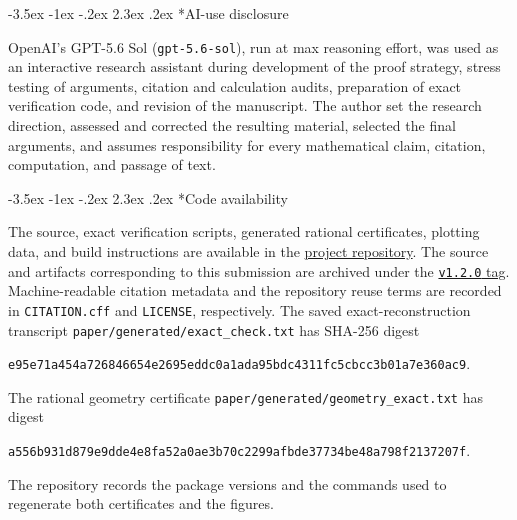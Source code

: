 \documentclass[twoside,10pt]{article}
\makeatletter
\numberwithin{equation}{section}
\theoremstyle{slbody}
\theoremstyle{definition}
\theoremstyle{remark}
\renewcommand{\section}{%
  \@startsection{section}{1}{\z@}%
    {-3.5ex \@plus -1ex \@minus -.2ex}%
    {2.3ex \@plus .2ex}%
    {\normalfont\large\bfseries}}
\makeatother
\begin{document}
\section*{AI-use disclosure}

OpenAI's GPT-5.6 Sol (\texttt{gpt-5.6-sol}), run at max reasoning
effort, was used as an interactive research assistant during development
of the proof strategy, stress testing of arguments, citation and
calculation audits, preparation of exact verification code, and revision
of the manuscript.  The author set the research direction, assessed and
corrected the resulting material, selected the final arguments, and
assumes responsibility for every mathematical claim, citation,
computation, and passage of text.

\section*{Code availability}

The source, exact verification scripts, generated rational certificates,
plotting data, and build instructions are available in the
\href{https://github.com/skypher/su2-markovian-embeddability}{project
repository}.  The source and artifacts corresponding to this submission
are archived under the
\href{https://github.com/skypher/su2-markovian-embeddability/tree/v1.2.0}
{\texttt{v1.2.0} tag}.  Machine-readable citation
metadata and the
repository reuse terms are recorded in \texttt{CITATION.cff} and
\texttt{LICENSE}, respectively.
The saved
exact-reconstruction transcript
\texttt{paper/generated/exact\_check.txt} has SHA-256 digest
\begin{center}
\small\texttt{e95e71a454a726846654e2695eddc0a1ada95bdc4311fc5cbcc3b01a7e360ac9}.
\end{center}
The rational geometry certificate
\texttt{paper/generated/geometry\_exact.txt} has digest
\begin{center}
\small\texttt{a556b931d879e9dde4e8fa52a0ae3b70c2299afbde37734be48a798f2137207f}.
\end{center}
The repository records the package versions and the commands used to
regenerate both certificates and the figures.



\end{document}
